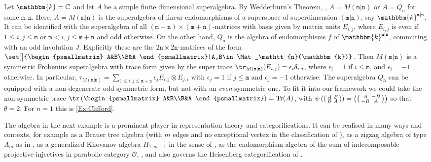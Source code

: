 \documentclass[a4paper,11pt]{amsart}
\numberwithin{equation}{subsection}
\theoremstyle{definition}
\theoremstyle{theorem}
\theoremstyle{remark}
\newcommand\tm{\mathtt{m}}
\newcommand\tn{\mathtt{n}}
\newcommand\op{\operatorname}
\newcommand\kk{\mathbbm{k}}
\begin{document}
\begin{Example}\label{exsemisimple}
Let $\kk=\mathbb{C}$ and let $A$ be a simple finite dimensional
superalgebra. By Wedderburn's Theorem, \cite[Theorem
12.2.9]{Kleshchevbook},  $A=M(\tm|\tn)$ or $A=Q_\tn$ for some $\tm,\tn$. Here,
$A=M(\tm|\tn)$ is the superalgebra of linear endomorphisms of a
superspace of superdimension $(\tm|\tn)$, say  $\kk^{\tm|\tn}$. It
can be identified with the superalgebra of all $(\tm+\tn)\times
(\tm+\tn)$-matrices with basis given by matrix units $E_{i,j}$, where
$E_{i,j}$ is even if $1\leq i,j\leq \tm$ or $\tm< i,j\leq \tm+\tn$ and
odd otherwise.  On the other hand, $Q_\tn$ is the algebra of
endomorphisms $f$ of $\kk^{\tn|\tn}$,  commuting with an odd involution $J$. Explicitly these are the $2\tn\times 2\tn$-matrices of the form $\set[\big]{\begin{psmallmatrix} A&B\\B&A \end{psmallmatrix}|A,B\in\Mat_\tn(\kk)}$.
Then $M(\tm|\tn)$ is a symmetric Frobenius superalgebra with trace form
given by the super trace
$\tr_{M(\tm|\tn)}(E_{i,j})=\epsilon_i\delta_{i,j}$, where $\epsilon_i=1$ if
$i\leq \tm$, and $\epsilon_i=-1$ otherwise.
 In particular, $\tau_{M(\tm|\tn)}=\sum_{1\leq i,j\leq
 \tm+\tn}\epsilon_jE_{i,j}\otimes E_{j,i}$ with $\epsilon_j=1$ if $j\le
 \tm$
 and $\epsilon_j=-1$ otherwise. The superalgebra $Q_\tn$ can be equipped
 with a non-degenerate odd symmetric form, but not with an \emph{even} symmetric one. To fit it into our framework we could take the non-symmetric trace $\tr\left(\begin{psmallmatrix} A&B\\B&A \end{psmallmatrix}\right)=\op{Tr}(A)$, with $\psi\left(\begin{psmallmatrix} A&B\\B&A \end{psmallmatrix}\right)=\left(\begin{psmallmatrix} A&-B\\-B&A \end{psmallmatrix}\right)$ so that $\theta=2$. For $n = 1$ this is
\autoref{Ex:Clifford}.
\end{Example}
The algebra in the next example is a prominent player in representation theory and categorifications. It can be realised in many ways and contexts, for example  as a Brauer tree
  algebra (with $m$ edges and no exceptional vertex in the classification of
  \cite{Rickard}), as a zigzag algebra of type $A_m$ as in
  \cite{KhovanovHuerfano, KhovanovSeidel}, as a generalized
  Khovanov algebra $H_{1,m-1}$ in the sense of
  \cite{BrundanStroppel:KhovanovI},  as the endomorphism algebra of the sum of indecomposable
 projective-injectives in parabolic category $\mathcal{O}$,
 \cite[Theorem~4.6]{MazStr}, and also governs the Heisenberg categorification of \cite{CautisLicata:Heisenberg}.
\end{document}
